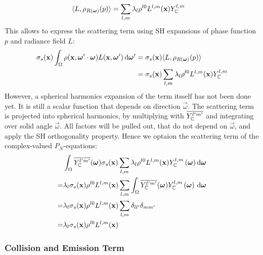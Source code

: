 \begin{align*}
\langle L,  \rho_{R(\boldsymbol{\mathbf{\omega}})}(p)\rangle
&=
\sum_{l,m}
{
\lambda_l
\rho^{l0}L^{l,m}(\boldsymbol{\mathbf{x}})
Y_{\mathbb{C}}^{l,m}
}
\end{align*}
This allows to express the scattering term using SH expansions of phase function $p$ and radiance field $L$:
\begin{align*}
\sigma_s(\boldsymbol{\mathbf{x}})\int_{\Omega}\rho(\boldsymbol{\mathbf{x}}, \boldsymbol{\mathbf{\omega}}'\cdot\boldsymbol{\mathbf{\omega}})L(\boldsymbol{\mathbf{x}}, \boldsymbol{\mathbf{\omega}}')\,\mathrm{d}\boldsymbol{\mathbf{\omega}}'
&=
\sigma_s(\boldsymbol{\mathbf{x}})\langle L,  \rho_{R(\boldsymbol{\mathbf{\omega}})}(p)\rangle
\\
&=
\sigma_s(\boldsymbol{\mathbf{x}})
\sum_{l,m}
{
\lambda_l
\rho^{l0}L^{l,m}(\boldsymbol{\mathbf{x}})
Y_{\mathbb{C}}^{l,m}
}
\end{align*}
However, a spherical harmonics expansion of the term itsself has not been done yet. It is still a scalar function that depends on direction $\vec{\omega}$. The scattering term is projected into spherical harmonics, by multiplying with $\overline {Y_{\mathbb{C}}^{l'm'}}$ and integrating over solid angle $\vec{\omega}$. All factors will be pulled out, that do not depend on $\vec{\omega}$, and apply the SH orthogonality property. Hence we optaion the scattering term of the complex-valued $P_N$-equations:
\begin{align}
&
\int_{\Omega}
{
\overline{Y_{\mathbb{C}}^{l'm'}}(\boldsymbol{\mathbf{\omega}})
\sigma_s(\boldsymbol{\mathbf{x}})
\sum_{l,m}
{
\lambda_l
\rho^{l0}L^{l,m}(\boldsymbol{\mathbf{x}})
Y_{\mathbb{C}}^{l,m}\left(\boldsymbol{\mathbf{\omega}}\right)
}
\,\mathrm{d}\boldsymbol{\mathbf{\omega}}
}
\nonumber\\
=&
\lambda_l
\sigma_s(\boldsymbol{\mathbf{x}})
\rho^{l0}L^{l,m}(\boldsymbol{\mathbf{x}})
\sum_{l,m}
{
\int_{\Omega}
{
\overline{Y_{\mathbb{C}}^{l'm'}}(\boldsymbol{\mathbf{\omega}})
Y_{\mathbb{C}}^{l,m}\left(\boldsymbol{\mathbf{\omega}}\right)
\,\mathrm{d}\boldsymbol{\mathbf{\omega}}
}
}
\nonumber\\
=&
\lambda_l
\sigma_s(\boldsymbol{\mathbf{x}})
\rho^{l0}L^{l,m}(\boldsymbol{\mathbf{x}})
\sum_{l,m}
{
\delta_{ll'}\delta_{mm'}
}
\nonumber\\
=&
\lambda_l
\sigma_s(\boldsymbol{\mathbf{x}})
\rho^{l0}L^{l,m}(\boldsymbol{\mathbf{x}})
\label{eq:sh_complex_scattering}
\end{align}



\subsubsection*{Collision and Emission Term}

